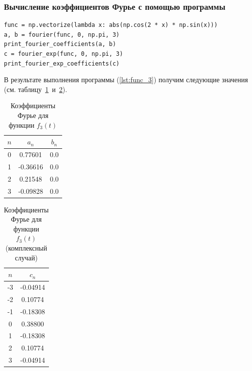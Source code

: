 \subsubsection{Вычисление коэффициентов Фурье с помощью программы}

\begin{lstlisting}[style=python_white, caption=Вычисление коэффициентов Фурье, label=lst:func_3]
func = np.vectorize(lambda x: abs(np.cos(2 * x) * np.sin(x)))
a, b = fourier(func, 0, np.pi, 3)
print_fourier_coefficients(a, b)
c = fourier_exp(func, 0, np.pi, 3)
print_fourier_exp_coefficients(c)
\end{lstlisting}

В результате выполнения программы (\ref{lst:func_3}) получим следующие значения (см. таблицу~\ref{tab:func_3}~и~\ref{tab:func_3_exp}).

\begin{table}[ht!]
    \centering
    \begin{tabular}{|c|c|c|}
        \hline
        $n$ & $a_n$ & $b_n$ \\
        \hline
        0 & 0.77601 & 0.0 \\
        1 & -0.36616 & 0.0 \\
        2 & 0.21548 & 0.0 \\
        3 & -0.09828 & 0.0 \\
        \hline
    \end{tabular}
    \caption{Коэффициенты Фурье для функции $f_3(t)$}
    \label{tab:func_3}
\end{table}

\begin{table}[ht!]
    \centering
    \begin{tabular}{|c|c|}
        \hline
        $n$ & $c_n$ \\
        \hline
        -3 & -0.04914 \\
        -2 & 0.10774 \\
        -1 & -0.18308 \\
        0 & 0.38800 \\
        1 & -0.18308 \\
        2 & 0.10774 \\
        3 & -0.04914 \\
        \hline
    \end{tabular}
    \caption{Коэффициенты Фурье для функции $f_3(t)$ (комплексный случай)}
    \label{tab:func_3_exp}
\end{table}

